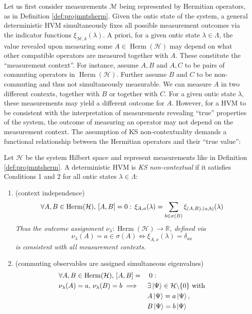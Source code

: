 Let us first consider measurements $\mathcal{M}$ being represented by Hermitian operators, as in Definition \ref{def:projmntsherm}. Given the ontic state of the system, a general deterministic HVM simultaneously fixes all possible measurement outcomes via the indicator functions $\xi_{\mathcal{M},k}(\lambda)$. A priori, for a given ontic state $\lambda\in\Lambda$, the value revealed upon measuring some $A\in\operatorname{Herm}(\mathcal{H})$ may depend on what other compatible operators are measured together with $A$. These constitute the ``measurement context”. For instance, assume $A,B$ and $A,C$ to be pairs of commuting operators in $\operatorname{Herm}(\mathcal{H})$. Further assume $B$ and $C$ to be non-commuting and thus not simultaneously measurable. We can measure $A$ in two different contexts, together with $B$ or together with $C$. For a given ontic state $\lambda$, these measurements may yield a different outcome for $A$. However, for a HVM to be consistent with the interpretation of measurements revealing ``true” properties of the system, the outcome of measuring an operator may not depend on the measurement context. The assumption of KS non-contextuality demands a functional relationship between the Hermitian operators and their ``true value”:

\begin{definition}
\label{def:kscontherm}
Let $\mathcal{H}$ be the system Hilbert space and represent measurements like in Definition \ref{def:projmntsherm}. A deterministic HVM is \emph{KS non-contextual} if it satisfies Conditions 1 and 2 for all ontic states $\lambda\in\Lambda$:
\begin{enumerate}
    \item (context independence)
    \begin{equation*}
    \forall A,B\in\operatorname{Herm}(\mathcal{H}), \thinspace[A,B]=0: \thinspace\xi_{A,a}(\lambda)=\sum_{b\in\sigma(B)}\xi_{(A,B),(a,b)}(\lambda)    
    \end{equation*}
    {\small\emph{Thus the outcome assignment $\nu_{\lambda}:\operatorname{Herm}(\mathcal{H})\rightarrow\mathbb{\mathbb{R}}$, defined via \begin{equation*}
    \nu_{\lambda}(A)=a\in\sigma(A)\iff\xi_{A,x}(\lambda)=\delta_{ax} 
    \end{equation*} is consistent with all measurement contexts.}}
    \item (commuting observables are assigned simultaneous eigenvalues)
    \begin{alignat*}{2}
    & \forall A,B\in\operatorname{Herm}(\mathcal{H}), \thinspace[A,B]= &&\; 0:\\&\nu_{\lambda}(A)=a,\thinspace \nu_{\lambda}(B)=b \implies && \exists\ket{\Psi} \in\mathcal{H}\backslash\{0\}\text{ with}\\& &&
    A\ket{\Psi} =a\ket{\Psi},\\ &
    && B\ket{\Psi} =b\ket{\Psi}
    \end{alignat*}
\end{enumerate}
\end{definition}

